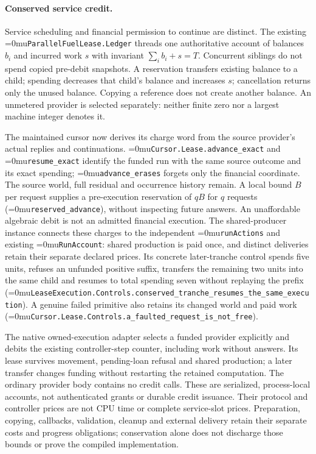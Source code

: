 \documentclass[11pt]{article}
\newcommand{\leanname}[1]{\textup{\Urlmuskip=0mu\relax\nolinkurl{#1}}}
\theoremstyle{definition}
\theoremstyle{remark}
\begin{document}
\paragraph{Conserved service credit.}
Service scheduling and financial permission to continue are distinct. The
existing \leanname{ParallelFuelLease.Ledger} threads one authoritative account
of balances $b_i$ and incurred work $s$ with invariant $\sum_i b_i+s=T$.
Concurrent siblings do not spend copied pre-debit snapshots. A reservation transfers
existing balance to a child; spending decreases that child's balance and
increases $s$; cancellation returns only the unused balance. Copying a
reference does not create another balance. An unmetered provider is selected
separately: neither finite zero nor a largest machine integer denotes it.

The maintained cursor now derives its charge word from the source provider's
actual replies and continuations. \leanname{Cursor.Lease.advance_exact} and
\leanname{resume_exact} identify the funded run with the same source outcome
and its exact spending; \leanname{advance_erases} forgets only the financial
coordinate. The source world, full residual and occurrence history remain.
A local bound $B$ per request supplies a pre-execution reservation of $qB$ for
$q$ requests (\leanname{reserved_advance}), without inspecting future answers.
An unaffordable algebraic debit is not an admitted financial execution.
The shared-producer instance connects these charges to the independent
\leanname{runActions} and existing \leanname{RunAccount}: shared production is
paid once, and distinct deliveries retain their separate declared prices.
Its concrete later-tranche control spends five units, refuses an unfunded
positive suffix, transfers the remaining two units into the same child and
resumes to total spending seven without replaying the prefix
(\leanname{LeaseExecution.Controls.conserved_tranche_resumes_the_same_execution}).
A genuine failed primitive also retains its changed world and paid work
(\leanname{Cursor.Lease.Controls.a_faulted_request_is_not_free}).

The native owned-execution adapter selects a funded provider explicitly and
debits the existing controller-step counter, including work without answers.
Its lease survives movement, pending-loan refusal and shared production; a
later transfer changes funding without restarting the retained computation.
The ordinary provider body contains no credit calls. These are serialized,
process-local accounts, not authenticated grants or durable credit issuance.
Their protocol and controller prices are not CPU time or complete service-slot
prices. Preparation, copying, callbacks, validation, cleanup and external
delivery retain their separate costs and progress obligations; conservation
alone does not discharge those bounds or prove the compiled implementation.
\end{document}
